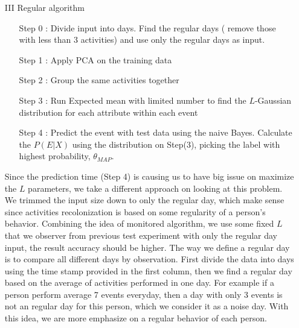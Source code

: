 \documentclass[a4paper, conference]{IEEEtran}
\begin{document}
\begin{itemize}
\item [III] Regular algorithm
\begin{itemize}
\item [Step 0] : Divide input into days. Find the regular days ( remove those with less than 3 activities) and use only the regular days as input.
\item [Step 1] : Apply PCA on the training data
\item [Step 2] : Group the same activities together
\item [Step 3] : Run Expected mean with limited number to find the $L$-Gaussian distribution for each attribute within each  event
\item [Step 4] : Predict the event with test data using the naive Bayes. Calculate the $P(E|X)$ using the distribution on Step(3), picking the label with highest probability, $\theta_{MAP}$.
\end{itemize}
Since the prediction time (Step 4) is causing us to have big issue on maximize the $L$ parameters, we take a different approach on looking at this problem. We trimmed the input size down to only the regular day, which make sense since activities recolonization is based on some regularity of a person's behavior. Combining the idea of monitored algorithm, we use some fixed $L$ that we observer from previous test experiment with only the regular day input, the result accuracy should be higher. 
The way we define a regular day is to compare all different days by observation. First divide the data into days using the time stamp provided in the first column, then we find a regular day based on the average of activities performed in one day. For example if a person perform average 7 events everyday, then a day with only 3 events is not an regular day for this person, which we consider it as a noise day. With this idea, we are more emphasize on a regular behavior of each person.
\end{itemize}
\end{document}
